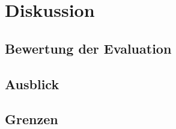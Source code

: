 \chapter{Diskussion}

% 

\section{Bewertung der Evaluation}

\section{Ausblick}

\section{Grenzen}

